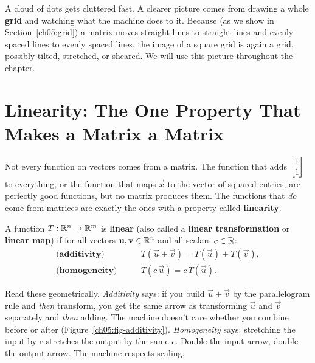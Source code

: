 A cloud of dots gets cluttered fast. A clearer picture comes from drawing a whole
\textbf{grid} and watching what the machine does to it. Because (as we show in
Section~\ref{ch05:grid}) a matrix moves straight lines to
straight lines and evenly spaced lines to evenly spaced lines, the image of a
square grid is again a grid, possibly tilted, stretched, or sheared. We
will use this picture throughout the chapter.

\section{Linearity: The One Property That Makes a Matrix a Matrix}
\label{ch05:linearity}

Not every function on vectors comes from a matrix. The function that adds
$\begin{bmatrix}1\\1\end{bmatrix}$ to everything, or the function that maps $\vec{x}$ to the vector
of squared entries, are perfectly good functions, but no matrix produces them.
The functions that \emph{do} come from matrices are exactly the ones with a
property called \textbf{linearity}.

\begin{definition}
\label{ch05:def-linear}
A function $T : \mathbb{R}^n \to \mathbb{R}^m$ is \textbf{linear} (also called a \textbf{linear
transformation} or \textbf{linear map}) if for all vectors
$\mathbf{u}, \mathbf{v} \in \mathbb{R}^n$ and all scalars $c \in \mathbb{R}$:
\begin{align*}
  \textbf{(additivity)} \qquad & T(\vec{u} + \vec{v}) = T(\vec{u}) + T(\vec{v}), \\
  \textbf{(homogeneity)} \qquad & T(c\,\vec{u}) = c\,T(\vec{u}).
\end{align*}
\end{definition}

Read these geometrically. \emph{Additivity} says: if you build $\vec{u}+\vec{v}$
by the parallelogram rule and \emph{then} transform, you get the same arrow as
transforming $\vec{u}$ and $\vec{v}$ separately and \emph{then} adding. The
machine doesn't care whether you combine before or after (Figure~\ref{ch05:fig-additivity}).
\emph{Homogeneity} says: stretching the input by $c$ stretches the output by the
same $c$. Double the input arrow, double the output arrow. The machine respects
scaling.

